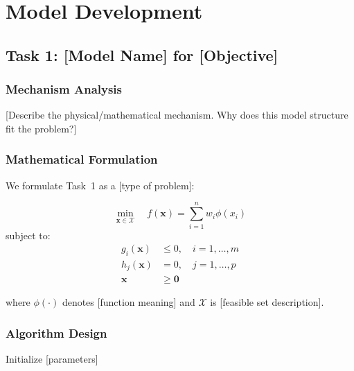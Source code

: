\documentclass{mcmthesis}
\newcommand{\vect}[1]{\boldsymbol{#1}}
\begin{document}
\section{Model Development}

\subsection{Task 1: [Model Name] for [Objective]}

\subsubsection{Mechanism Analysis}

[Describe the physical/mathematical mechanism. Why does this model structure fit the problem?]

\subsubsection{Mathematical Formulation}

We formulate Task~1 as a [type of problem]:

\begin{equation}
    \min_{\vect{x} \in \mathcal{X}} \quad f(\vect{x}) = \sum_{i=1}^{n} w_i \phi(x_i)
    \label{eq:obj_task1}
\end{equation}
subject to:
\begin{align}
    g_i(\vect{x}) &\leq 0, \quad i = 1, \ldots, m   \label{eq:ineq} \\
    h_j(\vect{x}) &=    0, \quad j = 1, \ldots, p   \label{eq:eq}   \\
    \vect{x}      &\geq \vect{0}                     \label{eq:nn}
\end{align}

where $\phi(\cdot)$ denotes [function meaning] and $\mathcal{X}$ is [feasible set description].

\subsubsection{Algorithm Design}

\begin{algorithm}[H]
\SetAlgoLined
\KwIn{[Inputs]}
\KwOut{[Outputs]}
Initialize [parameters]\;
\Return{[result]}\;
\caption{[Algorithm Name] for Task 1}
\end{algorithm}
\end{document}
